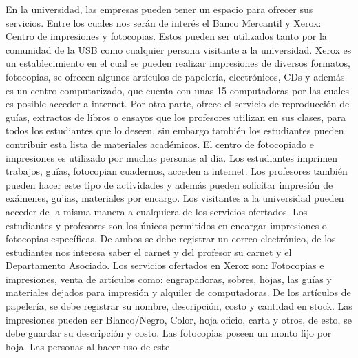 \documentclass[12pt,a4paper,spanish]{article}
\begin{document}
\indent En la universidad, las empresas pueden tener un espacio para
ofrecer sus servicios. Entre los cuales nos ser\'an de inter\'es el
Banco Mercantil y Xerox: Centro de impresiones y fotocopias. Estos pueden ser utilizados tanto por la comunidad de la USB como cualquier persona visitante a la universidad. 
\newline
\newline
\indent Xerox es un establecimiento en el cual se pueden realizar
impresiones de diversos formatos, fotocopias, se ofrecen algunos
art\'iculos de papeler\'ia, electr\'onicos, CDs y adem\'as es un
centro computarizado, que cuenta con unas 15 computadoras por las
cuales es posible acceder a internet. Por otra parte, ofrece el
servicio de reproducci\'on de gu\'ias, extractos de libros o ensayos
que los profesores utilizan en sus clases, para todos los estudiantes
que lo deseen, sin embargo tambi\'en los estudiantes pueden contribuir
esta lista de materiales acad\'emicos.
\newline
\newline
\indent El centro de fotocopiado e impresiones es utilizado por muchas
personas al d\'ia. Los estudiantes imprimen trabajos, gu\'ias,
fotocopian cuadernos, acceden a internet. Los profesores tambi\'en
pueden hacer este tipo de actividades y adem\'as pueden solicitar
impresi\'on de ex\'amenes, gu'ias, materiales por encargo. Los
visitantes a la universidad pueden acceder de la misma manera a
cualquiera de los servicios ofertados.
\newline
\newline
\indent Los estudiantes y profesores son los \'unicos permitidos en
encargar impresiones o fotocopias espec\'ificas. De ambos se debe
registrar un correo electr\'onico, de los estudiantes nos interesa
saber el carnet y del profesor su carnet y el Departamento Asociado.
\newline
\newline
\indent Los servicios ofertados en Xerox son: Fotocopias e
impresiones, venta de art\'iculos como: engrapadoras, sobres, hojas,
las gu\'ias y materiales dejados para impresi\'on y alquiler de
computadoras. De los art\'iculos de papeler\'ia, se debe registrar su
nombre, descripci\'on, costo y cantidad en stock.
\newline
\newline
\indent Las impresiones pueden ser Blanco/Negro, Color, hoja oficio,
carta y otros, de esto, se debe guardar su descripci\'on y costo. Las fotocopias
poseen un monto fijo por hoja. Las personas al hacer uso de este
\end{document}
